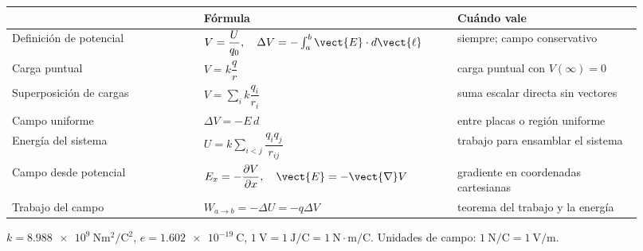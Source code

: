 \documentclass[11pt]{article}
\begin{document}
\renewcommand{\arraystretch}{1.65}
\begin{center}\small
\begin{tabular}{>{\raggedright\arraybackslash}p{0.28\linewidth} >{\centering\arraybackslash}p{0.37\linewidth} >{\raggedright\arraybackslash}p{0.27\linewidth}}
\toprule
{\sffamily\small\bfseries Situación} & {\sffamily\small\bfseries Fórmula} & {\sffamily\small\bfseries Cuándo vale}\\
\midrule
Definición de potencial & $V=\dfrac{U}{q_0},\quad \Delta V=-\int_{a}^{b}\vect{E}\cdot d\vect{\ell}$ & siempre; campo conservativo \\
Carga puntual & $V=k\dfrac{q}{r}$ & carga puntual con $V(\infty)=0$ \\
Superposición de cargas & $V=\sum_i k\dfrac{q_i}{r_i}$ & suma escalar directa sin vectores \\
Campo uniforme & $\Delta V = -E\,d$ & entre placas o región uniforme \\
Energía del sistema & $U=k\sum_{i<j}\dfrac{q_iq_j}{r_{ij}}$ & trabajo para ensamblar el sistema \\
Campo desde potencial & $E_x=-\dfrac{\partial V}{\partial x},\quad \vect{E}=-\vect{\nabla}V$ & gradiente en coordenadas cartesianas \\
Trabajo del campo & $W_{a\to b} = -\Delta U = -q\Delta V$ & teorema del trabajo y la energía \\
\bottomrule
\end{tabular}
\end{center}
{\small\color{e10muted}$k=\SI{8,988e9}{\newton\metre\squared\per\coulomb\squared}$, $e=\SI{1,602e-19}{\coulomb}$, $1\ \mathrm{V}=1\ \mathrm{J/C}=1\ \mathrm{N\cdot m/C}$. Unidades de campo: $\SI{1}{\newton\per\coulomb}=\SI{1}{\volt\per\metre}$.}
\end{document}
